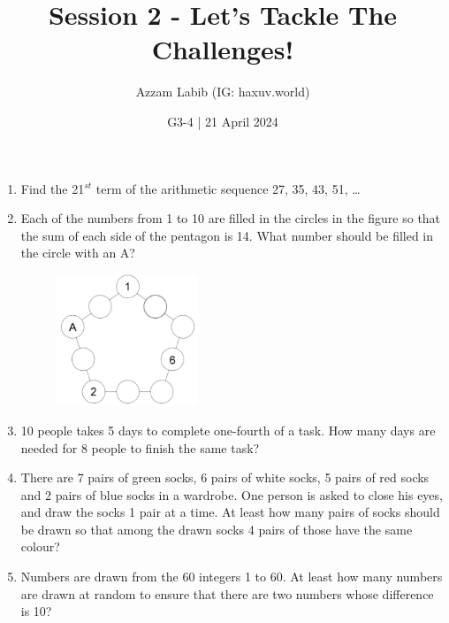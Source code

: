 \documentclass[11pt]{scrartcl}
\title{Session 2 - Let's Tackle The Challenges!}
\author{Azzam Labib (IG: haxuv.world)}
\date{G3-4 | 21 April 2024}
\begin{document}
\maketitle

\begin{enumerate}
    \section{Logical Thinking and Combinatorics}
    \item Find the 21$^{st}$ term of the arithmetic sequence 27, 35, 43, 51, \ldots


    \vspace{5cm}\item Each of the numbers from 1 to 10 are filled in the circles in the figure so that the sum of each side of the pentagon is 14. What number should be filled in the circle with an A?
    \begin{figure}[h]
        \centering
        \includegraphics[width=0.4\textwidth]{StarGen/AIMO Trial G3-4 2024/necklace5.png}
    \end{figure}

    \vspace{10cm}\item 10 people takes 5 days to complete one-fourth of a task. How many days are needed for 8 people to finish the same task?

    \vspace{10cm}\item There are 7 pairs of green socks, 6 pairs of white socks, 5 pairs of red socks and 2 pairs of blue socks in a wardrobe. One person is asked to close his eyes, and draw the socks 1 pair at a time. At least how many pairs of socks should be drawn so that among the drawn socks 4 pairs of those have the same colour?
    
    \vspace{10cm}\item Numbers are drawn from the 60 integers 1 to 60. At least how many numbers are drawn at random to ensure that there are two numbers whose difference is 10?


\end{enumerate}
\end{document}
